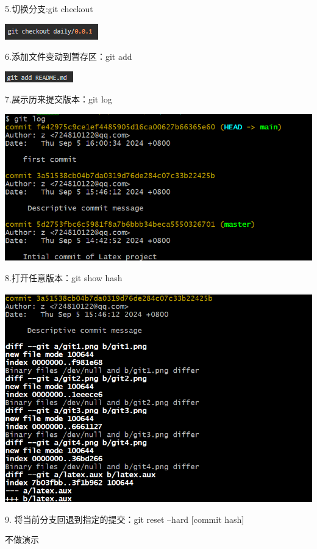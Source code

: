 \documentclass{article}
\begin{document}
	5.切换分支:git checkout
	
	\noindent
	\begin{minipage}{\linewidth}
		\centering
		\includegraphics[width=0.5\linewidth]{checkout.png}
	\end{minipage}
	
	6.添加文件变动到暂存区：git add
	
	\noindent
	\begin{minipage}{\linewidth}
		\centering
		\includegraphics[width=0.5\linewidth]{add.png}
	\end{minipage}
	
	7.展示历来提交版本：git log
	
	\noindent
	\begin{minipage}{\linewidth}
		\centering
		\includegraphics[width=0.5\linewidth]{log.png}
	\end{minipage}
	
	8.打开任意版本：git show hash
	
	\noindent
	\begin{minipage}{\linewidth}
		\centering
		\includegraphics[width=0.5\linewidth]{hash.png}
	\end{minipage}
	
	9. 将当前分支回退到指定的提交：git reset --hard [commit hash]
	
	不做演示
	
\end{document}
